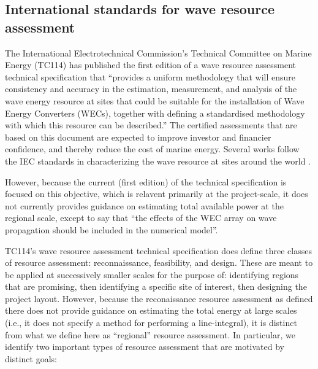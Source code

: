 \subsection{International standards for wave resource assessment}

The International Electrotechnical Commission's Technical Committee on
Marine Energy (TC114) has published the first edition of a wave
resource assessment technical specification that ``provides a uniform
methodology that will ensure consistency and accuracy in the
estimation, measurement, and analysis of the wave energy resource at
sites that could be suitable for the installation of Wave Energy
Converters (WECs), together with defining a standardised methodology
with which this resource can be described.'' The certified assessments
that are based on this document are expected to improve investor and
financier confidence, and thereby reduce the cost of marine
energy. Several works follow the IEC standards in characterizing the
wave resource at sites around the world
\citep{zhengAssessingChinaSea2013,neillWavePowerVariability2013,iglesiasWaveEnergyPotential2009,sierraWaveEnergyResource2013,robertsonCharacterizingShoreWave2014,internationalelectrotechnicalcommissionPart101Wave2015}.

However, because the current (first edition) of the
technical specification is focused on this objective, which is
relavent primarily at the project-scale, it does not currently
provides guidance on estimating total available power at the regional
scale, except to say that ``the effects of the WEC array on wave
propagation should be included in the numerical model''.

TC114's wave resource assessment technical specification does define
three classes of resource assessment: reconnaissance, feasibility, and
design. These are meant to be applied at successively smaller scales
for the purpose of: identifying regions that are promising, then
identifying a specific site of interest, then designing the project
layout. However, because the reconaissance resource
assessment as defined there does not provide guidance on estimating
the total energy at large scales (i.e., it does not specify a method
for performing a line-integral), it is distinct from what we define
here as ``regional'' resource assessment. In particular, we identify
two important types of resource assessment that are motivated by
distinct goals:

